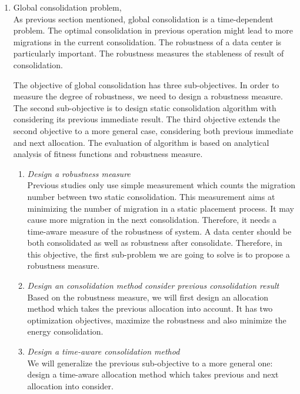 \begin{enumerate}
	\item Global consolidation problem, \\
	As previous section mentioned, global consolidation is a time-dependent problem. The optimal consolidation in previous operation might lead to more migrations in the current consolidation. The robustness of a data center is particularly important. The robustness measures the stableness of result of consolidation.

	The objective of global consolidation has three sub-objectives.
	In order to measure the degree of robustness, we need to design a robustness measure. The second sub-objective is to design static consolidation algorithm with considering its previous immediate result. The third objective extends the second objective to a more general case, considering both previous immediate and next allocation. The evaluation of algorithm is based on analytical analysis of fitness functions and robustness measure. 

	\begin{enumerate}
		\item \emph{Design a robustness measure} \\
 		Previous studies only use simple measurement which counts the migration number between two static consolidation. This measurement aims at minimizing the number of migration in a static placement process. It may cause more migration in the next consolidation. Therefore, it needs a time-aware measure of the robustness of system. A data center should be both consolidated as well as robustness after consolidate. Therefore, in this objective, the first sub-problem we are going to solve is to propose a robustness measure.
		\item \emph{Design an consolidation method consider previous consolidation result} \\
		Based on the robustness measure, we will first design an allocation method which takes the previous allocation into account. It has two optimization objectives, maximize the robustness and also minimize the energy consolidation.
		\item \emph{Design a time-aware consolidation method}\\
		We will generalize the previous sub-objective to a more general one: design a time-aware allocation method which takes previous and next allocation into consider.
	\end{enumerate}


\end{enumerate}
